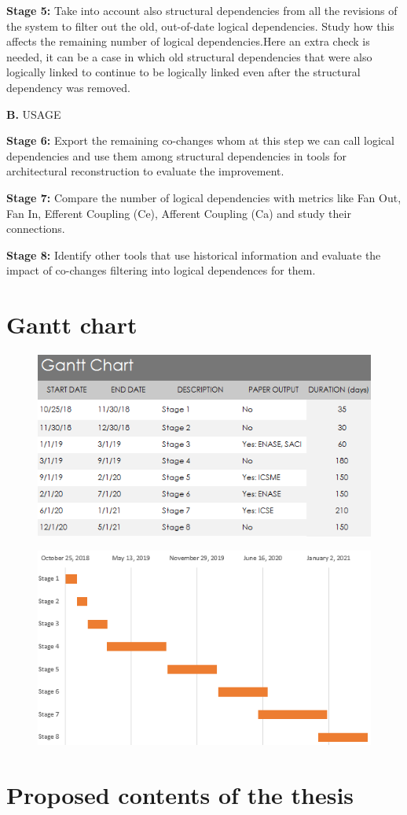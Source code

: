 \documentclass[12pt]{mitthesis}
\begin{document}
\textbf{Stage 5:} Take into account also structural dependencies from all the revisions of the system to filter out the old, out-of-date logical dependencies. 
Study how this affects the remaining number of logical dependencies.Here an extra check is needed, it can be a case in which old structural dependencies that were also logically linked to continue to be logically linked
even after the structural dependency was removed.

\textbf{B.} USAGE

\textbf{Stage 6:} Export the remaining co-changes whom at this step we can call logical dependencies and use them among structural dependencies in tools for architectural reconstruction to evaluate the improvement.

\textbf{Stage 7:} Compare the number of logical dependencies with metrics like Fan Out, Fan In, Efferent Coupling (Ce), Afferent Coupling (Ca) and study their connections.

\textbf{Stage 8:} Identify other tools that use historical information and evaluate the impact of co-changes filtering into logical dependences for them. 

\section{Gantt chart}

\begin{figure}[h]
\centering
\includegraphics[width=\textwidth]{gantt_chart.PNG}
\label{fig:gantt1}
\end{figure}

\begin{figure}[h]
\centering
\includegraphics[width=\textwidth]{gantt_plot.PNG}
\label{fig:gantt2}
\end{figure}

\section{Proposed contents of the thesis}



\end{document}
